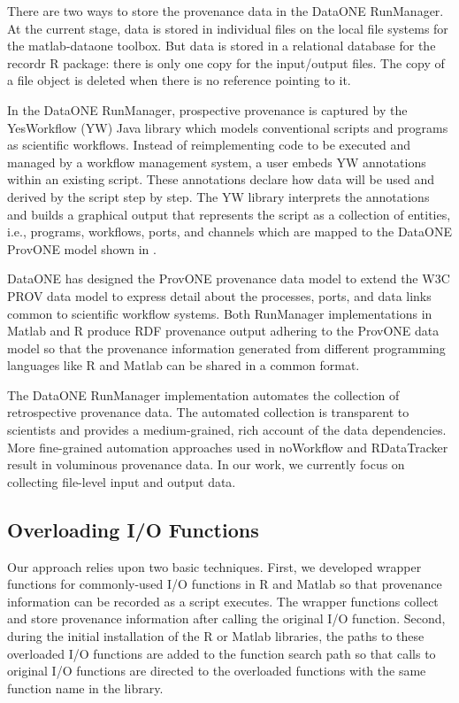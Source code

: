 \documentclass[runningheads,a4paper]{llncs}
\begin{document}
{There are two ways to store the provenance data in the DataONE RunManager. At the current stage, data is stored in individual files on the local file systems for the matlab-dataone toolbox. But data is stored in a relational database for the recordr R package: there is only one copy for the input/output files. The copy of a file object is deleted when there is no reference pointing to it.

In the DataONE RunManager, prospective provenance is captured by the YesWorkflow (YW) \cite{yesworkflow} Java library which models conventional scripts and programs as scientific workflows. Instead of reimplementing code to be executed and managed by a workflow management system, a user embeds YW annotations within an existing script. These annotations declare how data will be used and derived by the script step by step. The YW library interprets the annotations and builds a graphical output that represents the script as a collection of entities, i.e., programs, workflows, ports, and channels which are mapped to the DataONE ProvONE model shown in \cite{provone-model}. 

DataONE has designed the ProvONE provenance data model to extend the W3C PROV data model \cite{prov} to express detail about the processes, ports, and data links common to scientific workflow systems. Both RunManager implementations in Matlab and R produce RDF provenance output adhering to the ProvONE data model so that the provenance information generated from different programming languages like R and Matlab can be shared in a common format.

The DataONE RunManager implementation automates the collection of retrospective provenance data. The automated collection is transparent to scientists and provides a medium-grained, rich account of the data dependencies.  More fine-grained automation approaches used in noWorkflow and RDataTracker result in voluminous provenance data. In our work, we currently focus on collecting file-level input and output data. 



\subsection{Overloading I/O Functions}

Our approach relies upon two basic techniques. First, we developed wrapper functions for commonly-used I/O functions in R and Matlab so that provenance information can be recorded as a script executes. The wrapper functions collect and store provenance information after calling the original I/O function. Second, during the initial installation of the R or Matlab libraries, the paths to these overloaded I/O functions are added to the function search path so that calls to original I/O functions are directed to the overloaded functions with the same function name in the library. 

}
\end{document}
